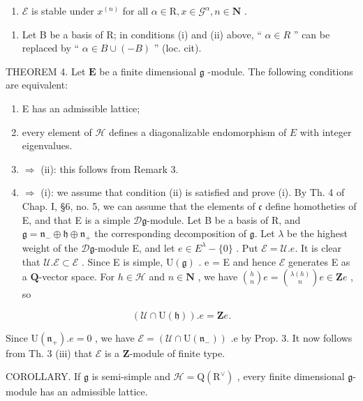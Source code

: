 \begin{enumerate}
\def\labelenumi{(\roman{enumi})}
\setcounter{enumi}{2}
\tightlist
\item
  \(\mathcal{E}\) is stable under \(x^{(n)}\) for all \(\alpha \in \mathrm{R}, x \in \mathcal{G}^{\alpha}, n \in \mathbf{N}\) .
\end{enumerate}

\begin{enumerate}
\def\labelenumi{\arabic{enumi})}
\setcounter{enumi}{4}
\tightlist
\item
  Let B be a basis of R; in conditions (i) and (ii) above, `` \(\alpha \in R\) '' can be replaced by `` \(\alpha \in B \cup (-B)\) '' (loc. cit).
\end{enumerate}

THEOREM 4. Let \(\mathbf{E}\) be a finite dimensional \(\mathfrak{g}\) -module. The following conditions are equivalent:

\begin{enumerate}
\def\labelenumi{(\roman{enumi})}
\item
  E has an admissible lattice;
\item
  every element of \(\mathcal{H}\) defines a diagonalizable endomorphism of \(E\) with integer eigenvalues.
\item
  \(\Longrightarrow\) (ii): this follows from Remark 3.
\item
  \(\Longrightarrow\) (i): we assume that condition (ii) is satisfied and prove (i). By Th. 4 of Chap. I, §6, no. 5, we can assume that the elements of \(\mathfrak{c}\) define homotheties of E, and that E is a simple \(\mathcal{D}\mathfrak{g}\)-module. Let B be a basis of \(\mathrm{R}\), and \(\mathfrak{g} = \mathfrak{n}_{-} \oplus \mathfrak{h} \oplus \mathfrak{n}_{+}\) the corresponding decomposition of \(\mathfrak{g}\). Let \(\lambda\) be the highest weight of the \(\mathcal{D}\mathfrak{g}\)-module E, and let \(e \in E^{\lambda} - \{0\}\) . Put \(\mathcal{E} = \mathcal{U}.e\). It is clear that \(\mathcal{U}.\mathcal{E} \subset \mathcal{E}\) . Since E is simple, \(\mathrm{U}(\mathfrak{g})\) . e = E and hence \(\mathcal{E}\) generates E as a \(\mathbf{Q}\)-vector space. For \(h \in \mathcal{H}\) and \(n \in \mathbf{N}\) , we have \(\binom{h}{n} e = \binom{\lambda(h)}{n} e \in \mathbf{Z} e\) , so
\end{enumerate}

\[
(\mathcal {U} \cap \mathrm{U} (\mathfrak {h})). e = \mathbf {Z}   e.
\]

Since \(\mathrm{U}(\mathfrak{n}_{+}).e=0\) , we have \(\mathcal{E}=(\mathcal{U}\cap\mathrm{U}(\mathfrak{n}_{-}))\) .e by Prop. 3. It now follows from Th. 3 (iii) that \(\mathcal{E}\) is a \(\mathbf{Z}\)-module of finite type.

COROLLARY. If \(\mathfrak{g}\) is semi-simple and \(\mathcal{H}=\mathrm{Q}(\mathrm{R}^{\vee})\) , every finite dimensional \(\mathfrak{g}\)-module has an admissible lattice.

